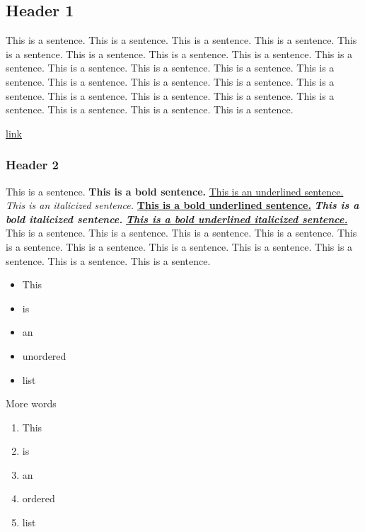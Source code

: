 \label{019e007e-afdf-7ebf-a01c-9059ba1c902b}

\subsection{Header 1}

This is a sentence. This is a sentence. This is a sentence. This is a sentence. This is a sentence. This is a sentence. This is a sentence. This is a sentence. This is a sentence. This is a sentence. This is a sentence. This is a sentence. This is a sentence. This is a sentence. This is a sentence. This is a sentence. This is a sentence. This is a sentence. This is a sentence. This is a sentence. This is a sentence. This is a sentence. This is a sentence. This is a sentence.

\underline{\hyperref[019e007e-afdf-7a5c-bcb9-8ec04bbc5227]{link}}

\subsubsection{Header 2}

This is a sentence. \textbf{This is a bold sentence.} \underline{This is an underlined sentence.} \textit{This is an italicized sentence.} \underline{\textbf{This is a bold underlined sentence.}}\textbf{ }\textit{\textbf{This is a bold italicized sentence.}} \underline{\textit{\textbf{This is a bold underlined italicized sentence.}}} This is a sentence. This is a sentence. This is a sentence. This is a sentence. This is a sentence. This is a sentence. This is a sentence. This is a sentence. This is a sentence. This is a sentence. This is a sentence.

\begin{itemize}
  \item This
  \item is
  \item an
  \item unordered
  \item list
\end{itemize}

More words

\begin{enumerate}
  \item This
  \item is
  \item an
  \item ordered
  \item list
\end{enumerate}


